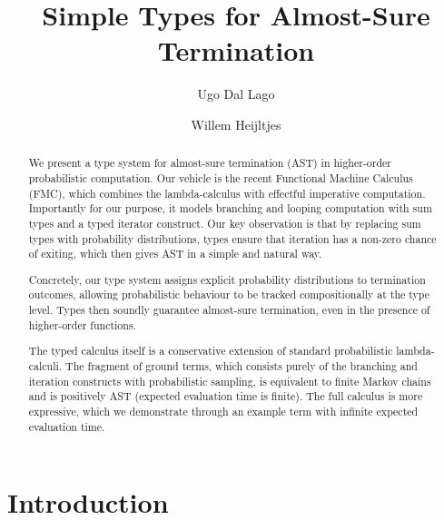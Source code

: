 \documentclass[a4paper,UKenglish,cleveref, autoref, thm-restate]{lipics-v2021}
\title{Simple Types for Almost-Sure Termination}
\author{Ugo {Dal Lago}}{University of Bologna, Italy \and INRIA Sophia Antipolis, France}{ugo.dallago@unibo.it}{https://orcid.org/0000-0001-9200-070X}{}
\author{Willem Heijltjes}{University of Bath, United Kingdom \and \url{http://willem.heijltj.es}}{w.b.heijltjes@bath.ac.uk}{https://orcid.org/0009-0001-8941-1150}{}
\begin{document}
\maketitle

\begin{abstract}
We present a type system for almost-sure termination (AST) in higher-order probabilistic computation. Our vehicle is the recent Functional Machine Calculus (FMC), which combines the lambda-calculus with effectful imperative computation. Importantly for our purpose, it models branching and looping computation with sum types and a typed iterator construct. Our key observation is that by replacing sum types with probability distributions, types ensure that iteration has a non-zero chance of exiting, which then gives AST in a simple and natural way. 

Concretely, our type system assigns explicit probability distributions to termination outcomes, allowing probabilistic behaviour to be tracked compositionally at the type level. Types then soundly guarantee almost-sure termination, even in the presence of higher-order functions. 

The typed calculus itself is a conservative extension of standard probabilistic lambda-calculi. The fragment of ground terms, which consists purely of the branching and iteration constructs with probabilistic sampling, is equivalent to finite Markov chains and is positively AST (expected evaluation time is finite). The full calculus is more expressive, which we demonstrate through an example term with infinite expected evaluation time.

\end{abstract}




\section{Introduction}
\end{document}
